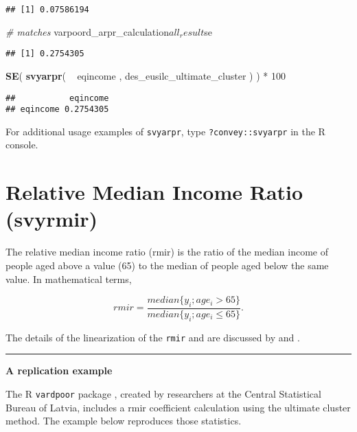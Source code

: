 \documentclass[]{book}
\newenvironment{Shaded}{\begin{snugshade}}{\end{snugshade}}
\newcommand{\KeywordTok}[1]{\textcolor[rgb]{0.13,0.29,0.53}{\textbf{{#1}}}}
\newcommand{\DecValTok}[1]{\textcolor[rgb]{0.00,0.00,0.81}{{#1}}}
\newcommand{\StringTok}[1]{\textcolor[rgb]{0.31,0.60,0.02}{{#1}}}
\newcommand{\CommentTok}[1]{\textcolor[rgb]{0.56,0.35,0.01}{\textit{{#1}}}}
\newcommand{\NormalTok}[1]{{#1}}
\begin{document}
\begin{verbatim}
## [1] 0.07586194
\end{verbatim}

\begin{Shaded}
\begin{Highlighting}[]
\CommentTok{# matches}
\NormalTok{varpoord_arpr_calculation$all_result$se}
\end{Highlighting}
\end{Shaded}

\begin{verbatim}
## [1] 0.2754305
\end{verbatim}

\begin{Shaded}
\begin{Highlighting}[]
\KeywordTok{SE}\NormalTok{( }\KeywordTok{svyarpr}\NormalTok{( ~}\StringTok{ }\NormalTok{eqincome , des_eusilc_ultimate_cluster ) ) *}\StringTok{ }\DecValTok{100}
\end{Highlighting}
\end{Shaded}

\begin{verbatim}
##           eqincome
## eqincome 0.2754305
\end{verbatim}

For additional usage examples of \texttt{svyarpr}, type
\texttt{?convey::svyarpr} in the R console.

\section{Relative Median Income Ratio
(svyrmir)}\label{relative-median-income-ratio-svyrmir}

The relative median income ratio (rmir) is the ratio of the median
income of people aged above a value (65) to the median of people aged
below the same value. In mathematical terms,

\[
rmir = \frac{median\{y_i; age_i >65 \}}{median\{y_i; age_i \leq 65 \}}.
\]

The details of the linearization of the \texttt{rmir} and are discussed
by \citet{deville1999} and \citet{osier2009}.

\begin{center}\rule{0.5\linewidth}{\linethickness}\end{center}

\textbf{A replication example}

The R \texttt{vardpoor} package \citep{vardpoor}, created by researchers
at the Central Statistical Bureau of Latvia, includes a rmir coefficient
calculation using the ultimate cluster method. The example below
reproduces those statistics.
\end{document}
